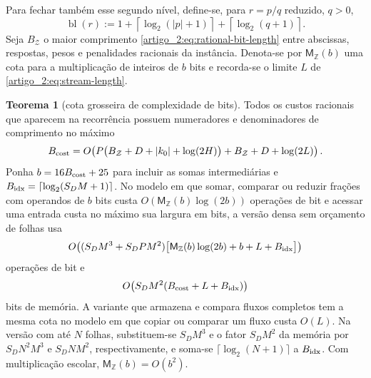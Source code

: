 \documentclass[12pt,a4paper]{article}
\theoremstyle{preciso}
\theoremstyle{definition}
\theoremstyle{preciso}
\newtheorem{theorem}[teorema]{Teorema}
\theoremstyle{preciso}
\theoremstyle{preciso}
\theoremstyle{preciso}
\theoremstyle{definition}
\theoremstyle{preciso}
\theoremstyle{definition}
\theoremstyle{preciso}
\theoremstyle{preciso}
\theoremstyle{definition}
\newcounter{absc}
\begin{document}
Para fechar também esse segundo nível, define-se, para $r=p/q$ reduzido, $q>0$,
\begin{equation}
 \operatorname{bl}(r)
 :=1+\left\lceil\log_2(|p|+1)\right\rceil
    +\left\lceil\log_2(q+1)\right\rceil .
 \label{artigo_2:eq:rational-bit-length}
\end{equation}
Seja $B_{\mathcal Z}$ o maior comprimento \eqref{artigo_2:eq:rational-bit-length}
entre abscissas, respostas, pesos e penalidades racionais da instância. Denota-se
por $\mathsf M_{\mathbb Z}(b)$ uma cota para a multiplicação de inteiros de $b$ bits
e recorda-se o limite $L$ de \eqref{artigo_2:eq:stream-length}.

\begin{theorem}[cota grosseira de complexidade de bits]\label{map:artigo_2:9.3}
\label{artigo_2:thm:bit-complexity}
Todos os custos racionais que aparecem na recorrência possuem numeradores e
denominadores de comprimento no máximo
\begin{equation}
 B_{\rm cost}
 =O\!\left(
 P\bigl(B_{\mathcal Z}+D+|k_0|+\log(2H)\bigr)
 +B_{\mathcal Z}+D+\log(2L)
 \right).
 \label{artigo_2:eq:cost-bit-growth}
\end{equation}
Ponha $b=16B_{\rm cost}+25$ para incluir as somas intermediárias e
$B_{\rm idx}=\lceil\log_2(S_DM+1)\rceil$. No modelo em que
somar, comparar ou reduzir frações com operandos de $b$ bits custa
$O(\mathsf M_{\mathbb Z}(b)\log(2b))$ operações de bit e acessar uma entrada
custa no máximo sua largura em bits, a versão densa sem orçamento de folhas usa
\begin{equation}
 O\!\left(
 (S_DM^3+S_DPM^2)
 \bigl[\mathsf M_{\mathbb Z}(b)
       \log(2b)+b+L+B_{\rm idx}\bigr]
 \right)
 \label{artigo_2:eq:dense-bit-time}
\end{equation}
operações de bit e
\begin{equation}
 O\!\left(S_DM^2(B_{\rm cost}+L+B_{\rm idx})\right)
 \label{artigo_2:eq:dense-bit-memory}
\end{equation}
bits de memória. A variante que armazena e compara fluxos completos tem
a mesma cota no modelo em que copiar ou comparar um fluxo custa $O(L)$.
Na versão com até $N$ folhas, substituem-se $S_DM^3$ e o fator $S_DM^2$
da memória por $S_DN^2M^3$ e $S_DNM^2$, respectivamente, e soma-se
$\lceil\log_2(N+1)\rceil$ a $B_{\rm idx}$. Com multiplicação escolar,
$\mathsf M_{\mathbb Z}(b)=O(b^2)$.
\end{theorem}
\end{document}
